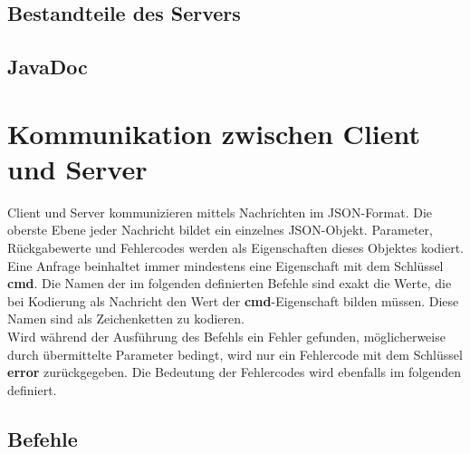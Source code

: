 \documentclass[parskip=full,11pt]{scrartcl}
\begin{document}
\subsection{Bestandteile des Servers}

\subsection{JavaDoc}

\pagebreak
\section{Kommunikation zwischen Client und Server}
Client und Server kommunizieren mittels Nachrichten im JSON-Format.
Die oberste Ebene jeder Nachricht bildet ein einzelnes JSON-Objekt.
Parameter, Rückgabewerte und Fehlercodes werden als Eigenschaften dieses
Objektes kodiert.
Eine Anfrage beinhaltet immer mindestens eine Eigenschaft mit dem Schlüssel
\textbf{cmd}.
Die Namen der im folgenden definierten Befehle sind exakt die Werte, die bei
Kodierung als Nachricht den Wert der \textbf{cmd}-Eigenschaft bilden müssen.
Diese Namen sind als Zeichenketten zu kodieren.
\\Wird während der Ausführung des Befehls ein Fehler gefunden, möglicherweise
durch übermittelte Parameter bedingt, wird nur ein Fehlercode mit dem Schlüssel
\textbf{error} zurückgegeben. Die Bedeutung der Fehlercodes wird ebenfalls im
folgenden definiert.

\subsection{Befehle}\label{sec:commands}


\end{document}

